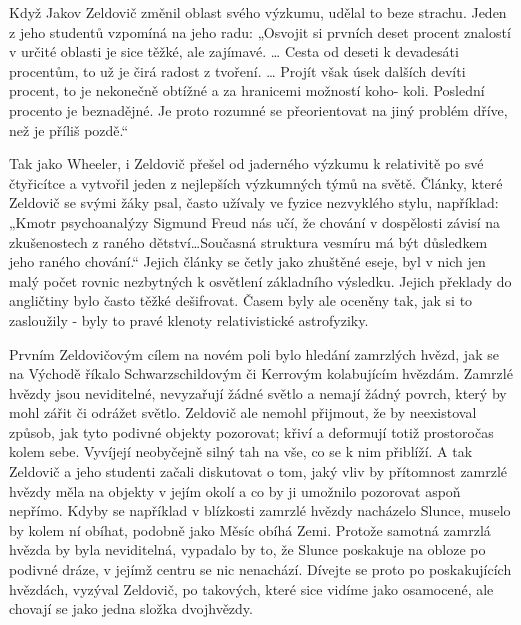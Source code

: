   Když Jakov Zeldovič změnil oblast svého výzkumu, udělal to beze strachu. Jeden z jeho studentů
  vzpomíná na jeho radu: „Osvojit si prvních deset procent znalostí v určité oblasti je sice těžké,
  ale zajímavé. … Cesta od deseti k devadesáti procentům, to už je čirá radost z tvoření. … Projít
  však úsek dalších devíti procent, to je nekonečně obtížné a za hranicemi možností koho- koli.
  Poslední procento je beznadějné. Je proto rozumné se přeorientovat na jiný problém dříve, než je
  příliš pozdě.“

  Tak jako Wheeler, i Zeldovič přešel od jaderného výzkumu k relativitě po své čtyřicítce a vytvořil
  jeden z nejlepších výzkumných týmů na světě. Články, které Zeldovič se svými žáky psal, často
  užívaly ve fyzice nezvyklého stylu, například: „Kmotr psychoanalýzy Sigmund Freud nás učí, že
  chování v dospělosti závisí na zkušenostech z raného dětství…Současná struktura vesmíru má být
  důsledkem jeho raného chování.“ Jejich články se četly jako zhuštěné eseje, byl v nich jen malý
  počet rovnic nezbytných k osvětlení základního výsledku. Jejich překlady do angličtiny bylo často
  těžké dešifrovat. Časem byly ale oceněny tak, jak si to zasloužily - byly to pravé klenoty
  relativistické astrofyziky. 

  Prvním Zeldovičovým cílem na novém poli bylo hledání zamrzlých hvězd, jak se na Východě říkalo
  Schwarzschildovým či Kerrovým kolabujícím hvězdám. Zamrzlé hvězdy jsou neviditelné, nevyzařují
  žádné světlo a nemají žádný povrch, který by mohl zářit či odrážet světlo. Zeldovič ale nemohl
  přijmout, že by neexistoval způsob, jak tyto podivné objekty pozorovat; křiví a deformují totiž
  prostoročas kolem sebe. Vyvíjejí neobyčejně silný tah na vše, co se k nim přiblíží. A tak Zeldovič
  a jeho studenti začali diskutovat o tom, jaký vliv by přítomnost zamrzlé hvězdy měla na objekty v
  jejím okolí a co by ji umožnilo pozorovat aspoň nepřímo. Kdyby se například v blízkosti zamrzlé
  hvězdy nacházelo Slunce, muselo by kolem ní obíhat, podobně jako Měsíc obíhá Zemi. Protože samotná
  zamrzlá hvězda by byla neviditelná, vypadalo by to, že Slunce poskakuje na obloze po podivné
  dráze, v jejímž centru se nic nenachází. Dívejte se proto po poskakujících hvězdách, vyzýval
  Zeldovič, po takových, které sice vidíme jako osamocené, ale chovají se jako jedna složka
  dvojhvězdy. 


